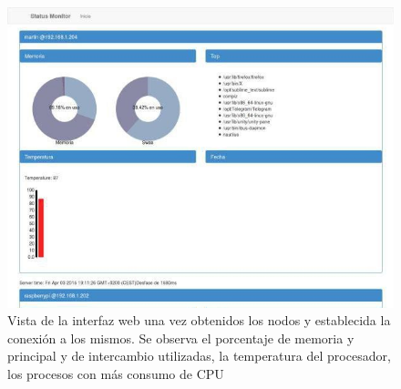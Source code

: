 
\begin{figure}[H]
	\centering
	\includegraphics[width=\textwidth]{Chapter5/Figures/statusmonitor}
	\caption[Vista de la interfaz web de \textbf{Statusmonitor} una vez obtenidos los nodos]{Vista de la interfaz web una vez obtenidos los nodos y establecida la conexión a los mismos. Se observa el porcentaje de memoria y principal y de intercambio utilizadas, la temperatura del procesador, los procesos con más consumo de CPU} %
	\label{fig:vista_statusmonitor}
\end{figure}

